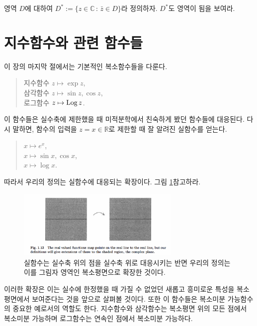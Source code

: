 \begin{salt_exercise} \label{ex-1-30}
영역 $D$에 대하여
$D^*:= \{z\in\mathbb C\,:\, \bar z \in D\}$라 정의하자.
$D^*$도 영역이 됨을 보여라.
\end{salt_exercise}

\section{지수함수와 관련 함수들}

이 장의 마지막 절에서는 기본적인 복소함수들을 다룬다.
\begin{quote}
지수함수 $z\mapsto \exp z$, \\[1ex]
삼각함수 $z\mapsto \sin z, \cos z$, \\[1ex]
로그함수  $z\mapsto \mathop{\mathrm{Log}} z$.
\end{quote}

이 함수들은 실수축에 제한했을 때
미적분학에서 친숙하게 봤던 함수들에 대응된다.
다시 말하면, 
함수의 입력을 $z=x\in\mathbb R$로 제한할 때
잘 알려진 실함수를 얻는다.
\begin{quote}
$x\mapsto e^x$, \\[1ex]
$x\mapsto \sin x, \cos x$, \\[1ex]
$x\mapsto \log x$.
\end{quote}

따라서 우리의 정의는 실함수에 대응되는 확장이다.
그림 \ref{fig-1-13}\을 참고하라.

\begin{figure}[!h]
\begin{center}
\includegraphics[width=0.7\textwidth]{./SaltChapter/fig-1-13}
\end{center}
\caption{실함수는 실수축 위의 점을 실수축 위로 대응시키는 반면
우리의 정의는 이를 그림자 영역인 복소평면으로 확장한 것이다.}
\label{fig-1-13}
\end{figure}

이러한 확장은  
이는 실수에 한정했을 때 가질 수 없었던 
새롭고 흥미로운 특성을 복소평면에서 보여준다는 것을 앞으로 살펴볼 것이다.
또한 이 함수들은 복소미분 가능함수의 중요한 예로서의 역할도 한다.
지수함수와 삼각함수는 복소평면 위의 모든 점에서 복소미분 가능하며
로그함수는 연속인 점에서 복소미분 가능하다.

